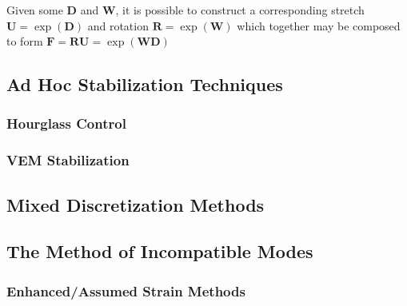 \documentclass[12pt]{book}
\begin{document}
Given some $\mathbf{D}$ and $\mathbf{W}$, it is possible to construct a corresponding stretch $\mathbf{U} = \exp (\mathbf{D})$ and rotation $\mathbf{R} = \exp (\mathbf{W})$ which together may be composed to form $\mathbf{F} = \mathbf{R} \mathbf{U} = \exp (\mathbf{W} \mathbf{D})$

\subsection{Ad Hoc Stabilization Techniques}
\subsubsection{Hourglass Control}
\subsubsection{VEM Stabilization}

\subsection{Mixed Discretization Methods}

\subsection{The Method of Incompatible Modes}
\subsubsection{Enhanced/Assumed Strain Methods}
\end{document}
